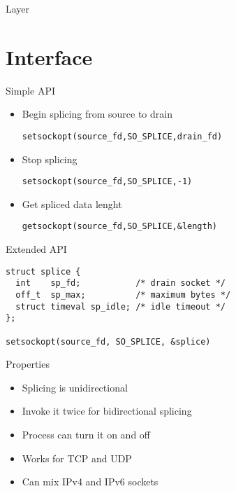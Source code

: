 \documentclass[14pt]{beamer}
\begin{document}
\begin{frame}{Layer}
\end{frame}

\section{Interface}


\begin{frame}{Simple API}
\begin{itemize}

    \item Begin splicing from source to drain
    \begin{alltt}
	setsockopt(source\_fd, SO\_SPLICE, drain\_fd)
    \end{alltt}

    \item Stop splicing
    \begin{alltt}
	setsockopt(source\_fd, SO\_SPLICE, -1)
    \end{alltt}

    \item Get spliced data lenght
    \begin{alltt}
	getsockopt(source\_fd, SO\_SPLICE, \&length)
    \end{alltt}
\end{itemize}
\end{frame}

\begin{frame}[fragile]{Extended API}
\begin{verbatim}
struct splice {
  int    sp_fd;           /* drain socket */
  off_t  sp_max;          /* maximum bytes */
  struct timeval sp_idle; /* idle timeout */
};

setsockopt(source_fd, SO_SPLICE, &splice)
\end{verbatim}
\end{frame}

\begin{frame}{Properties}
\begin{itemize}
    \item Splicing is unidirectional
    \item Invoke it twice for bidirectional splicing
    \item Process can turn it on and off
    \item Works for TCP and UDP
    \item Can mix IPv4 and IPv6 sockets
\end{itemize}
\end{frame}
\end{document}
